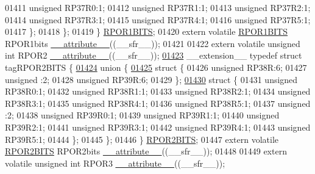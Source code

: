 \begin{DoxyCode}
01411       \textcolor{keywordtype}{unsigned} RP37R0:1;
01412       \textcolor{keywordtype}{unsigned} RP37R1:1;
01413       \textcolor{keywordtype}{unsigned} RP37R2:1;
01414       \textcolor{keywordtype}{unsigned} RP37R3:1;
01415       \textcolor{keywordtype}{unsigned} RP37R4:1;
01416       \textcolor{keywordtype}{unsigned} RP37R5:1;
01417     \};
01418   \};
01419 \} \hyperlink{a00008_d4/d8f/a00742}{RPOR1BITS};
01420 \textcolor{keyword}{extern} \textcolor{keyword}{volatile} \hyperlink{a00008_d4/d8f/a00742}{RPOR1BITS} RPOR1bits \hyperlink{a00009_a493c46f03454991ccc5aa7a6e1dfb2a7}{\_\_attribute\_\_}((\_\_sfr\_\_));
01421 
01422 \textcolor{keyword}{extern} \textcolor{keyword}{volatile} \textcolor{keywordtype}{unsigned} \textcolor{keywordtype}{int}  RPOR2 \hyperlink{a00009_a493c46f03454991ccc5aa7a6e1dfb2a7}{\_\_attribute\_\_}((\_\_sfr\_\_));
\hypertarget{a00009_source_l01423}{}\hyperlink{a00008}{01423} \_\_extension\_\_ \textcolor{keyword}{typedef} \textcolor{keyword}{struct }tagRPOR2BITS \{
\hypertarget{a00009_source_l01424}{}\hyperlink{a00009}{01424}   \textcolor{keyword}{union }\{
\hypertarget{a00009_source_l01425}{}\hyperlink{a00009}{01425}     \textcolor{keyword}{struct }\{
01426       \textcolor{keywordtype}{unsigned} RP38R:6;
01427       \textcolor{keywordtype}{unsigned} :2;
01428       \textcolor{keywordtype}{unsigned} RP39R:6;
01429     \};
\hypertarget{a00009_source_l01430}{}\hyperlink{a00009}{01430}     \textcolor{keyword}{struct }\{
01431       \textcolor{keywordtype}{unsigned} RP38R0:1;
01432       \textcolor{keywordtype}{unsigned} RP38R1:1;
01433       \textcolor{keywordtype}{unsigned} RP38R2:1;
01434       \textcolor{keywordtype}{unsigned} RP38R3:1;
01435       \textcolor{keywordtype}{unsigned} RP38R4:1;
01436       \textcolor{keywordtype}{unsigned} RP38R5:1;
01437       \textcolor{keywordtype}{unsigned} :2;
01438       \textcolor{keywordtype}{unsigned} RP39R0:1;
01439       \textcolor{keywordtype}{unsigned} RP39R1:1;
01440       \textcolor{keywordtype}{unsigned} RP39R2:1;
01441       \textcolor{keywordtype}{unsigned} RP39R3:1;
01442       \textcolor{keywordtype}{unsigned} RP39R4:1;
01443       \textcolor{keywordtype}{unsigned} RP39R5:1;
01444     \};
01445   \};
01446 \} \hyperlink{a00008_d1/d79/a00745}{RPOR2BITS};
01447 \textcolor{keyword}{extern} \textcolor{keyword}{volatile} \hyperlink{a00008_d1/d79/a00745}{RPOR2BITS} RPOR2bits \hyperlink{a00009_a493c46f03454991ccc5aa7a6e1dfb2a7}{\_\_attribute\_\_}((\_\_sfr\_\_));
01448 
01449 \textcolor{keyword}{extern} \textcolor{keyword}{volatile} \textcolor{keywordtype}{unsigned} \textcolor{keywordtype}{int}  RPOR3 \hyperlink{a00009_a493c46f03454991ccc5aa7a6e1dfb2a7}{\_\_attribute\_\_}((\_\_sfr\_\_));

\end{DoxyCode}
